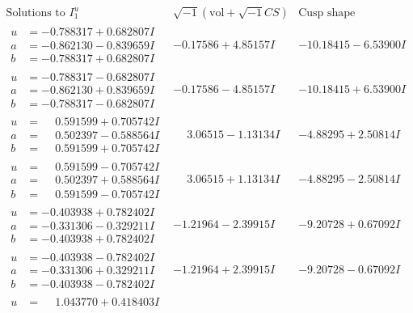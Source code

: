 \documentclass[1p]{elsarticle_modified}
\theoremstyle{definition}
\newcommand{\I}{\sqrt{-1}}
\begin{document}
$$\begin{array}{c|c|c}  
\text{Solutions to }I^u_{1}& \I (\text{vol} + \sqrt{-1}CS) & \text{Cusp shape}\\
 \hline 
\begin{aligned}
u &= -0.788317 + 0.682807 I \\
a &= -0.862130 - 0.839659 I \\
b &= -0.788317 + 0.682807 I\end{aligned}
 & -0.17586 + 4.85157 I & -10.18415 - 6.53900 I \\ \hline\begin{aligned}
u &= -0.788317 - 0.682807 I \\
a &= -0.862130 + 0.839659 I \\
b &= -0.788317 - 0.682807 I\end{aligned}
 & -0.17586 - 4.85157 I & -10.18415 + 6.53900 I \\ \hline\begin{aligned}
u &= \phantom{-}0.591599 + 0.705742 I \\
a &= \phantom{-}0.502397 - 0.588564 I \\
b &= \phantom{-}0.591599 + 0.705742 I\end{aligned}
 & \phantom{-}3.06515 - 1.13134 I & -4.88295 + 2.50814 I \\ \hline\begin{aligned}
u &= \phantom{-}0.591599 - 0.705742 I \\
a &= \phantom{-}0.502397 + 0.588564 I \\
b &= \phantom{-}0.591599 - 0.705742 I\end{aligned}
 & \phantom{-}3.06515 + 1.13134 I & -4.88295 - 2.50814 I \\ \hline\begin{aligned}
u &= -0.403938 + 0.782402 I \\
a &= -0.331306 - 0.329211 I \\
b &= -0.403938 + 0.782402 I\end{aligned}
 & -1.21964 - 2.39915 I & -9.20728 + 0.67092 I \\ \hline\begin{aligned}
u &= -0.403938 - 0.782402 I \\
a &= -0.331306 + 0.329211 I \\
b &= -0.403938 - 0.782402 I\end{aligned}
 & -1.21964 + 2.39915 I & -9.20728 - 0.67092 I \\ \hline\begin{aligned}
u &= \phantom{-}1.043770 + 0.418403 I \\

\end{aligned}
\end{array}$$
\end{document}

